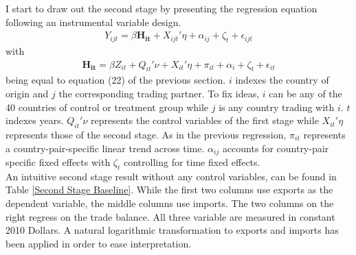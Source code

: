 \documentclass{article}
\begin{document}
I start to draw out the second stage by presenting the regression equation following an instrumental variable design.
\begin{align}
Y_{ijt} =  \beta \mathbf{H_{it}} +  X_{ijt}'\eta + \alpha_{ij} + \zeta_t + \epsilon_{ijt}
\end{align}
with 
\begin{align}
\mathbf{H_{it}} =  \beta Z_{it} +  Q_{it}'\nu + X_{it}'\eta + \pi_{it} + \alpha_i + \zeta_t + \epsilon_{it}
\end{align}
being equal to equation (22) of the previous section. $i$ indexes the country of origin and $j$ the corresponding trading partner. To fix ideas, $i$ can be any of the 40 countries of control or treatment group while $j$ is any country trading with $i$. $t$ indexes years. $Q_{it}'\nu$ represents the control variables of the first stage while $X_{it}'\eta$  represents those of the second stage. As in the previous regression, $\pi_{it}$ represents a country-pair-specific linear trend across time. $\alpha_{ij}$ accounts for country-pair specific fixed effects with $\zeta_t$ controlling for time fixed effects. \\
An intuitive second stage result without any control variables, can be found in Table \ref{Second Stage Baseline}. While the first two columns use exports as the dependent variable, the middle columns use imports. The two columns on the right regress on the trade balance. All three variable are measured in constant 2010 Dollars. A natural logarithmic transformation to exports and imports has been applied in order to ease interpretation.
\end{document}
